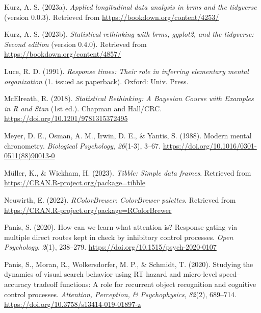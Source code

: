 \documentclass[
  man,floatsintext]{apa6}
\newlength{\cslhangindent}
\newenvironment{CSLReferences}[2] %
 {\begin{list}{}{%
  \setlength{\itemindent}{0pt}
  \setlength{\leftmargin}{0pt}
  \setlength{\parsep}{0pt}
  \ifodd #1
   \setlength{\leftmargin}{\cslhangindent}
   \setlength{\itemindent}{-1\cslhangindent}
  \fi
  \setlength{\itemsep}{#2\baselineskip}}}
 {\end{list}}
\begin{document}
\begin{CSLReferences}{1}{0}
Kurz, A. S. (2023a). \emph{Applied longitudinal data analysis in brms and the tidyverse} (version 0.0.3). Retrieved from \url{https://bookdown.org/content/4253/}

Kurz, A. S. (2023b). \emph{Statistical rethinking with brms, ggplot2, and the tidyverse: {Second} edition} (version 0.4.0). Retrieved from \url{https://bookdown.org/content/4857/}

Luce, R. D. (1991). \emph{Response times: Their role in inferring elementary mental organization} (1. issued as paperback). Oxford: Univ. Press.

McElreath, R. (2018). \emph{Statistical {Rethinking}: {A Bayesian Course} with {Examples} in {R} and {Stan}} (1st ed.). {Chapman and Hall/CRC}. \url{https://doi.org/10.1201/9781315372495}

Meyer, D. E., Osman, A. M., Irwin, D. E., \& Yantis, S. (1988). Modern mental chronometry. \emph{Biological Psychology}, \emph{26}(1-3), 3--67. \url{https://doi.org/10.1016/0301-0511(88)90013-0}

Müller, K., \& Wickham, H. (2023). \emph{Tibble: Simple data frames}. Retrieved from \url{https://CRAN.R-project.org/package=tibble}

Neuwirth, E. (2022). \emph{RColorBrewer: ColorBrewer palettes}. Retrieved from \url{https://CRAN.R-project.org/package=RColorBrewer}

Panis, S. (2020). How can we learn what attention is? {Response} gating via multiple direct routes kept in check by inhibitory control processes. \emph{Open Psychology}, \emph{2}(1), 238--279. \url{https://doi.org/10.1515/psych-2020-0107}

Panis, S., Moran, R., Wolkersdorfer, M. P., \& Schmidt, T. (2020). Studying the dynamics of visual search behavior using {RT} hazard and micro-level speed--accuracy tradeoff functions: {A} role for recurrent object recognition and cognitive control processes. \emph{Attention, Perception, \& Psychophysics}, \emph{82}(2), 689--714. \url{https://doi.org/10.3758/s13414-019-01897-z}


\end{CSLReferences}
\end{document}
